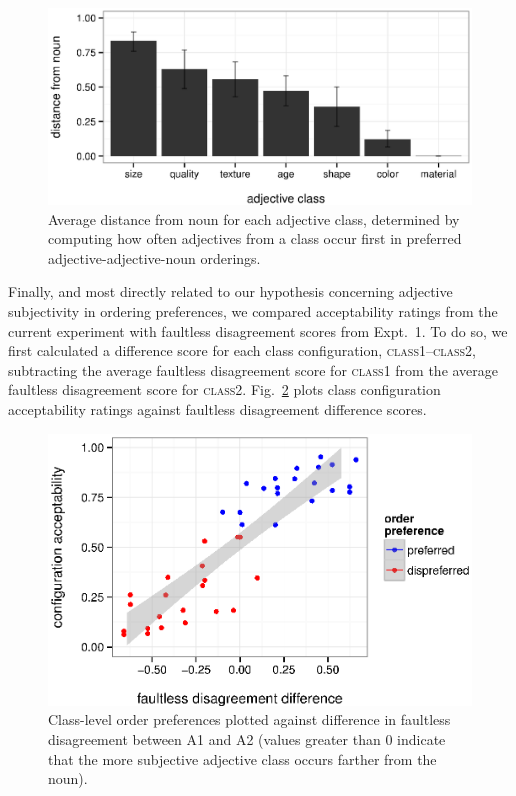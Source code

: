 \documentclass{pnastwo}
\begin{document}
\begin{article}
\begin{figure}[h]
	\centering
	\includegraphics[width=.95\linewidth]{plots/class_distance_by_adj.eps}
	\caption{Average distance from noun for each adjective class, determined by computing how often adjectives from a class occur first in preferred adjective-adjective-noun orderings.}\label{class-distance-by-adj}
\end{figure}

Finally, and most directly related to our hypothesis concerning adjective subjectivity in ordering preferences, we compared acceptability ratings from the current experiment with faultless disagreement scores from Expt.\ 1. To do so, we first calculated a difference score for each class configuration, \textsc{class1}--\textsc{class2}, subtracting the average faultless disagreement score for \textsc{class1} from the average faultless disagreement score for \textsc{class2}. Fig.\ \ref{faultless-order} plots class configuration acceptability ratings against faultless disagreement difference scores.

\begin{figure}[h]
	\centering
	\includegraphics[width=\linewidth]{plots/faultless_order_preference.eps}
	\caption{Class-level order preferences plotted against difference in faultless disagreement between A1 and A2 (values greater than 0 indicate that the more subjective adjective class occurs farther from the noun).}\label{faultless-order}
\end{figure}







\end{article}
\end{document}
